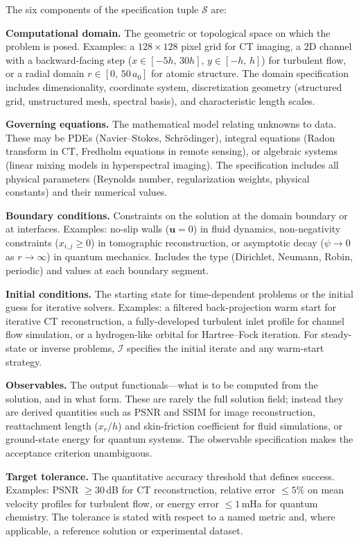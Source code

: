 \documentclass[11pt,a4paper]{article}
\newcommand{\Spec}{\mathcal{S}}
\newcommand{\Domain}{\Omega}
\begin{document}
The six components of the specification tuple $\Spec$ are:
\begin{description}[nosep,leftmargin=1em,labelwidth=1.8em,font=\normalfont\itshape]
\item[$\Domain$] \textbf{Computational domain.} The geometric or topological space on which the problem is posed. Examples: a $128\times128$ pixel grid for CT imaging, a 2D channel with a backward-facing step ($x \in [-5h,\,30h]$, $y\in[-h,\,h]$) for turbulent flow, or a radial domain $r \in [0,\,50\,a_0]$ for atomic structure. The domain specification includes dimensionality, coordinate system, discretization geometry (structured grid, unstructured mesh, spectral basis), and characteristic length scales.
\item[$\mathcal{E}$] \textbf{Governing equations.} The mathematical model relating unknowns to data. These may be PDEs (Navier--Stokes, Schr\"odinger), integral equations (Radon transform in CT, Fredholm equations in remote sensing), or algebraic systems (linear mixing models in hyperspectral imaging). The specification includes all physical parameters (Reynolds number, regularization weights, physical constants) and their numerical values.
\item[$\mathcal{B}$] \textbf{Boundary conditions.} Constraints on the solution at the domain boundary or at interfaces. Examples: no-slip walls ($\mathbf{u}=0$) in fluid dynamics, non-negativity constraints ($x_{i,j}\geq 0$) in tomographic reconstruction, or asymptotic decay ($\psi \to 0$ as $r\to\infty$) in quantum mechanics. Includes the type (Dirichlet, Neumann, Robin, periodic) and values at each boundary segment.
\item[$\mathcal{I}$] \textbf{Initial conditions.} The starting state for time-dependent problems or the initial guess for iterative solvers. Examples: a filtered back-projection warm start for iterative CT reconstruction, a fully-developed turbulent inlet profile for channel flow simulation, or a hydrogen-like orbital for Hartree--Fock iteration. For steady-state or inverse problems, $\mathcal{I}$ specifies the initial iterate and any warm-start strategy.
\item[$\mathcal{O}$] \textbf{Observables.} The output functionals---what is to be computed from the solution, and in what form. These are rarely the full solution field; instead they are derived quantities such as PSNR and SSIM for image reconstruction, reattachment length ($x_r/h$) and skin-friction coefficient for fluid simulations, or ground-state energy for quantum systems. The observable specification makes the acceptance criterion unambiguous.
\item[$\varepsilon$] \textbf{Target tolerance.} The quantitative accuracy threshold that defines success. Examples: PSNR $\geq 30$\,dB for CT reconstruction, relative error $\leq 5\%$ on mean velocity profiles for turbulent flow, or energy error $\leq 1$\,mHa for quantum chemistry. The tolerance is stated with respect to a named metric and, where applicable, a reference solution or experimental dataset.
\end{description}
\end{document}

